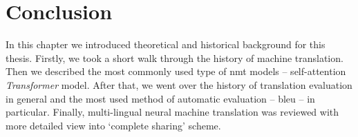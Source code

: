 \section{Conclusion}

In this chapter we introduced theoretical and historical background for this thesis.
Firstly, we took a short walk through the history of machine translation.
Then we described the most commonly used type of \acrshort{nmt} models --
self-attention \textit{Transformer} model.
After that, we went over the history of translation evaluation in general and the most
used method of automatic evaluation -- \acrshort{bleu} -- in particular.
Finally, multi-lingual neural machine translation was reviewed
with more detailed view into `complete sharing' scheme.
